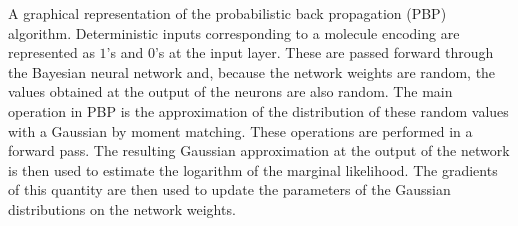 A graphical representation of the probabilistic back propagation (PBP)
algorithm. Deterministic inputs corresponding to a molecule encoding are represented as $1$'s and $0$'s at the input
layer. These are passed forward through the Bayesian neural network and, because
the network weights are random, the values obtained at the output of the
neurons are also random. The main operation in PBP is the approximation of the
distribution of these random values with a Gaussian by moment matching. These
operations are performed in a forward pass. The resulting Gaussian
approximation at the output of the network is then used to estimate the
logarithm of the marginal likelihood. The gradients of this quantity are then
used to update the parameters of the Gaussian distributions on the network
weights.
\label{fig:pbp}